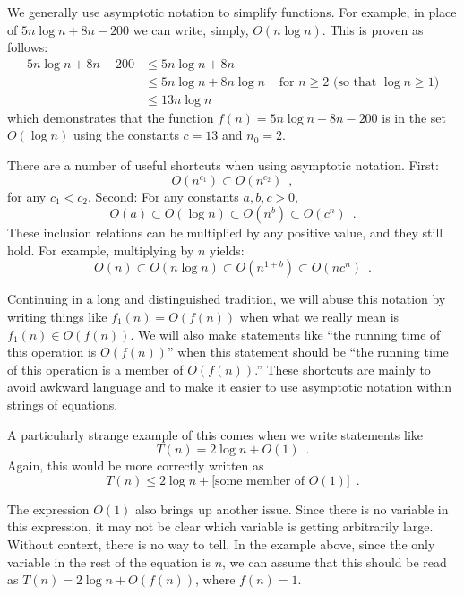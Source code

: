 We generally use asymptotic notation to simplify functions.  For example,
in place of $5n\log n + 8n - 200$ we can write, simply,  $O(n\log n)$.
This is proven as follows:
\begin{align*} 
       5n\log n + 8n - 200
        & \le 5n\log n + 8n \\
        & \le 5n\log n + 8n\log n & \mbox{ for $n\ge 2$ (so that $\log n \ge 1$)}
            \\
        & \le 13n\log n 
\end{align*}
which demonstrates that the function $f(n)=5n\log n + 8n - 200$ is in the set $O(\log n)$ using the constants $c=13$ and $n_0 = 2$.

There are a number of useful shortcuts when using asymptotic notation.  First:
\[ O(n^{c_1}) \subset O(n^{c_2}) \enspace ,\]
for any $c_1 < c_2$.  Second: For any constants $a,b,c > 0$,
\[ O(a) \subset O(\log n) \subset O(n^{b}) \subset O({c}^n) \enspace . \]
These inclusion relations can be multiplied by any positive value,
and they still hold. For example, multiplying by $n$ yields:
\[ O(n) \subset O(n\log n) \subset O(n^{1+b}) \subset O(n{c}^n) \enspace . \]

Continuing in a long and distinguished tradition, we will abuse this
notation by writing things like $f_1(n) = O(f(n))$ when what we really
mean is $f_1(n) \in O(f(n))$.  We will also make statements like ``the
running time of this operation is $O(f(n))$'' when this statement should
be ``the running time of this operation is a member of $O(f(n))$.''
These shortcuts are mainly to avoid awkward language and to make it
easier to use asymptotic notation within strings of equations.

A particularly strange example of this comes when we write statements like
\[
  T(n) = 2\log n + O(1)  \enspace .
\]
Again, this would be more correctly written as
\[
  T(n) \le 2\log n + [\mbox{some member of $O(1)$]}  \enspace .
\]

The expression $O(1)$ also brings up another issue. Since there is
no variable in this expression, it may not be clear which variable is
getting arbitrarily large.  Without context, there is no way to tell.
In the example above, since the only variable in the rest of the equation
is $n$, we can assume that this should be read as $T(n) = 2\log n +
O(f(n))$, where $f(n) = 1$.

